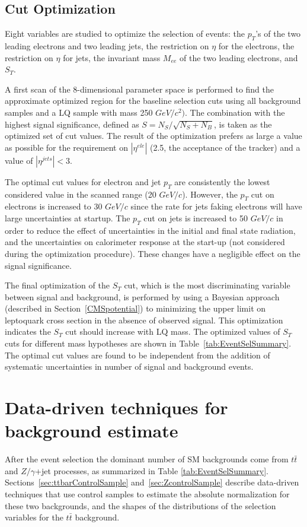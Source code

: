 \documentclass{cmspaper}
\begin{document}
\begin{linenumbers}
\subsection{Cut Optimization} \label{sec:cutOptimization}

Eight variables are studied to optimize the selection of  events:
 the $p_T$'s of the two leading electrons and two leading jets, the 
restriction 
on $\eta$ for the electrons, the restriction on 
$\eta$ for jets, the invariant mass $M_{ee}$ of the two leading electrons, 
and  $S_T$.


A first scan of the 8-dimensional parameter space is performed to find the 
approximate optimized region for the baseline selection cuts using all background samples
and a LQ sample with mass 250 $GeV/c^2)$.
The combination with the highest signal significance, 
defined as $S = N_S/\sqrt{N_S+N_B}$, is taken as the optimized set of cut values.
The result of the optimization prefers as large a value as possible for
the requirement on $|\eta^{ele}|$ (2.5, the acceptance of the tracker)
and a value of $|\eta^{jets}|<3$. 

The optimal cut values for electron and jet $p_T$ are consistently 
the lowest considered value in the scanned range 
(20 $GeV/c$). However, the $p_{T}$ cut on electrons is increased to 
30 $GeV/c$ since the rate for jets faking electrons will have
large uncertainties at startup.%
The $p_{T}$ cut on jets is increased to 50 $GeV/c$ in order to reduce the effect 
of uncertainties in the initial and final state radiation, and the uncertainties 
on calorimeter response at the start-up (not considered during the
optimization procedure).
These changes have a negligible effect on the signal significance. 

The final optimization of the $S_T$ cut, which is the most discriminating variable between signal and background, 
is performed by using a Bayesian approach (described in Section~\ref{CMSpotential}) to minimizing the upper limit 
on leptoquark cross section in the absence of observed signal. 
This optimization indicates the $S_T$ cut 
should increase with LQ mass. 
The optimized values of $S_{T}$ cuts for different mass hypotheses are shown in Table~\ref{tab:EventSelSummary}. 
The optimal cut values are found to be independent from the addition 
of systematic uncertainties in number of signal and background events.


\section{Data-driven techniques for background estimate} \label{sec:bkgStudy}
After the event selection the dominant number of SM backgrounds 
 come from $t\bar{t}$ and $Z/\gamma$+jet processes, 
as summarized in Table \ref{tab:EventSelSummary}. 
Sections~\ref{sec:ttbarControlSample} and~\ref{sec:ZcontrolSample} 
describe data-driven techniques that use control samples 
to estimate the absolute 
normalization for these two backgrounds, and the shapes of the distributions of
the selection variables 
for the $t\bar{t}$ background. 


\end{linenumbers}
\end{document}
